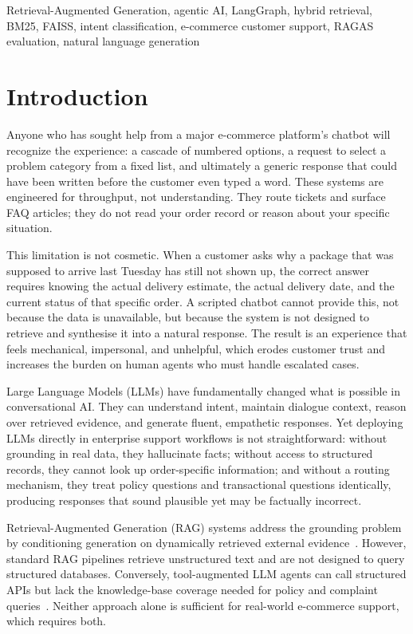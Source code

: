 \documentclass[conference]{IEEEtran}
\begin{document}
\begin{IEEEkeywords}
Retrieval-Augmented Generation, agentic AI, LangGraph, hybrid retrieval, BM25,
FAISS, intent classification, e-commerce customer support, RAGAS evaluation,
natural language generation
\end{IEEEkeywords}

\section{Introduction}

Anyone who has sought help from a major e-commerce platform's chatbot will recognize
the experience: a cascade of numbered options, a request to select a problem category
from a fixed list, and ultimately a generic response that could have been written
before the customer even typed a word. These systems are engineered for throughput,
not understanding. They route tickets and surface FAQ articles; they do not read your
order record or reason about your specific situation.

This limitation is not cosmetic. When a customer asks why a package that was
supposed to arrive last Tuesday has still not shown up, the correct answer requires
knowing the actual delivery estimate, the actual delivery date, and the current
status of that specific order. A scripted chatbot cannot provide this, not because
the data is unavailable, but because the system is not designed to retrieve and
synthesise it into a natural response. The result is an experience that feels
mechanical, impersonal, and unhelpful, which erodes customer trust and increases
the burden on human agents who must handle escalated cases.

Large Language Models (LLMs) have fundamentally changed what is possible in
conversational AI. They can understand intent, maintain dialogue context, reason
over retrieved evidence, and generate fluent, empathetic responses. Yet deploying
LLMs directly in enterprise support workflows is not straightforward: without
grounding in real data, they hallucinate facts; without access to structured
records, they cannot look up order-specific information; and without a routing
mechanism, they treat policy questions and transactional questions identically,
producing responses that sound plausible yet may be factually incorrect.

Retrieval-Augmented Generation (RAG) systems address the grounding problem by
conditioning generation on dynamically retrieved external evidence~\cite{b2}. However,
standard RAG pipelines retrieve unstructured text and are not designed to query
structured databases. Conversely, tool-augmented LLM agents can call structured
APIs but lack the knowledge-base coverage needed for policy and complaint
queries~\cite{b16}. Neither approach alone is sufficient for real-world e-commerce
support, which requires both.
\end{document}
